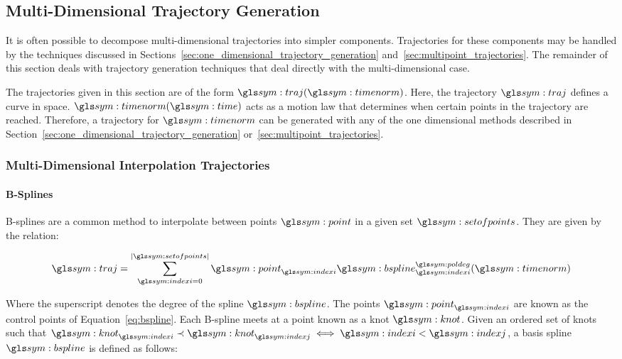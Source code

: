 	\subsection{Multi-Dimensional Trajectory Generation}%
	\label{sec:multi_dimensional_trajectory_generation}

		It is often possible to decompose multi-dimensional trajectories into
		simpler components. Trajectories for these components may be handled by
		the techniques discussed in
		Sections~\ref{sec:one_dimensional_trajectory_generation}
		and~\ref{sec:multipoint_trajectories}. The remainder of this section
		deals with trajectory generation techniques that deal directly with the
		multi-dimensional case.

		The trajectories given in this section are of the form
		$\traj(\timenorm)$. Here, the trajectory $\traj$ defines a curve in
		space. $\timenorm(\timesym)$ acts as a motion law that determines when
		certain points in the trajectory are reached. Therefore, a trajectory
		for $\timenorm$ can be generated with any of the one dimensional methods
		described in Section~\ref{sec:one_dimensional_trajectory_generation}
		or~\ref{sec:multipoint_trajectories}.

		\subsubsection{Multi-Dimensional Interpolation Trajectories}%
		\label{sec:multi_dimensional_interpolation_trajectories}

			\paragraph{B-Splines}%
			\label{sec:b_spines}

				B-splines are a common method to interpolate between points
				$\point$ in a given set $\setofpoints$. They are given by the
				relation:

				\begin{equation}
					\traj = \sum_{\indexi = 0}^{\cardinality{\setofpoints}}
						\point_{\indexi}\bspline_{\indexi}^{\poldeg}(\timenorm)
					\label{eq:bspline}
				\end{equation}

				Where the superscript denotes the degree of the spline
				$\bspline$. The points $\point_{\indexi}$ are known as the
				control points of Equation~\ref{eq:bspline}.  Each B-spline
				meets at a point known as a knot $\knot$. Given an ordered set
				of knots such that
				\(
					\knot_{\indexi} \prec \knot_{\indexj} \iff \indexi < \indexj
				\), a basis spline $\bspline$ is defined as follows:


